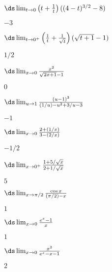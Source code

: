 \begin{enumialphparenastyle}
\begin{ex} 
 $\ds\lim_{t\to 0}{\left(t+{1\over t}\right)((4-t)^{3/2}-8)}$
\begin{sol}
 $-3$
\end{sol}
\end{ex}

\begin{ex} 
 $\ds\lim_{t\to 0^+}\left({1\over t}+{1\over\sqrt{t}}\right)
(\sqrt{t+1}-1)$
\begin{sol}
 $1/2$
\end{sol}
\end{ex}

\begin{ex} 
 $\ds\lim_{x\to 0}{x^2\over\sqrt{2x+1}-1}$
\begin{sol}
 $0$
\end{sol}
\end{ex}

\begin{ex} 
 $\ds\lim_{u\to 1}{(u-1)^3\over (1/u)-u^2+3/u-3}$
\begin{sol}
 $-1$
\end{sol}
\end{ex}

\begin{ex} 
 $\ds\lim_{x\to 0}{2+(1/x)\over 3-(2/x)}$
\begin{sol}
 $-1/2$
\end{sol}
\end{ex}

\begin{ex} 
 $\ds\lim_{x\to 0^+}{1+5/\sqrt{x}\over 2+1/\sqrt{x}}$
\begin{sol}
 $5$
\end{sol}
\end{ex}

\begin{ex} 
 $\ds\lim_{x\to\pi/2}{\cos x\over (\pi/2)-x}$
\begin{sol}
 $1$
\end{sol}
\end{ex}

\begin{ex} 
 $\ds\lim_{x\to0}{e^x-1\over x}$
\begin{sol}
 $1$
\end{sol}
\end{ex}

\begin{ex} 
 $\ds\lim_{x\to0}{x^2\over e^x-x-1}$
\begin{sol}
 $2$
\end{sol}
\end{ex}


\end{enumialphparenastyle}
